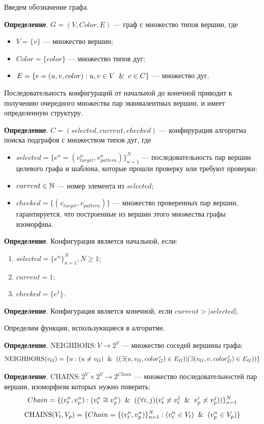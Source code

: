 Введем обозначение графа.

\textbf{Определение}. $G = ( V, Color, E )$ --- граф с множество типов вершин, где
\begin{itemize}
\item $V = \{ v \}$ --- множество вершин;
\item $Color = \{ color \}$ --- множество типов дуг;
\item $E = \{ e = (u, v, color) :  u, v \in V \And c \in C \}$ --- множество дуг.
\end{itemize}

Последовательность конфигураций от начальной до конечной приводит к получению
очередного множества пар эквивалентных вершин, и имеет определенную структуру.

\textbf{Определение}. $C = ( selected, current, checked )$ --- конфирурация
алгоритма поиска подграфов с множеством типов дуг, где
\begin{itemize}
\item $selected = \{ e^n = ( v^n_{target}, v^n_{pattern} ) \}_{n=1}^N$ ---
последовательность пар вершин целевого графа и шаблона, которые прошли проверку
или требуют проверки;
\item $current \in \mathbb{N}$ --- номер элемента из $selected$;
\item $checked = \{ ( v_{target}, v_{pattern} ) \}$ --- множество проверенных
пар вершин, гарантируется, что построенные из вершин этого множества графы
изоморфны.
\end{itemize}

\textbf{Определение}. Конфигурация является начальной, если:
\begin{enumerate}
\item $selected = \{ e^n \}_{n=1}^N, N \ge 1$;
\item $current = 1$;
\item $checked = \{ e^1 \}$.
\end{enumerate}

\textbf{Определение}. Конфигурация является конечной, если $current > |selected|$.

Определим функции, использующиеся в алгоритме.

\textbf{Определение}. $\textrm{NEIGHBORS} : V \to 2^V$ --- множество соседей вершины графа:
%
$$\textrm{NEIGHBORS}(v_G) = \{ u : (u \ne v_G) \And ( ( \exists (u, v_G, color^i_G) \in E_G ) | ( \exists (v_G, v, color^j_G) \in E_G ) ) \}$$

\textbf{Определение}. $\textrm{CHAINS} : 2^V \times 2^V \to 2^{Chain}$ --- множество последовательностей пар вершин, изоморфизм которых нужно поверить:
%
$$Chain = \{ ( v^n_t, v^n_p ) : ( v^n_t \cong v^n_p ) \And ( ( \forall i, j ) ( v^i_t \ne v^j_t \And v^i_p \ne v^j_p ) ) \}_{n = 1}^N$$
%
$$\textrm{CHAINS}(V_t, V_p) = \{ Chain = \{ ( v^n_t, v^n_p ) \}_{n = 1}^N : ( v^n_t \in V_t ) \And ( v^n_p \in V_p ) \}$$

